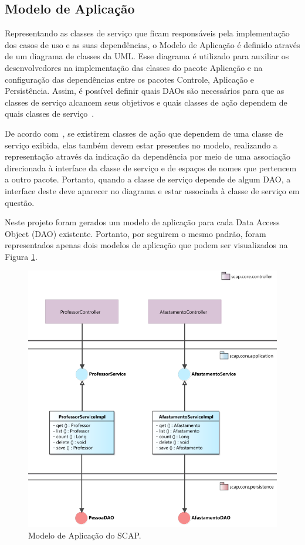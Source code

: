 \subsection{Modelo de Aplicação}
\label{sec-projeto-modelo-aplicacao}

Representando as classes de serviço que ficam responsáveis pela implementação dos casos de uso e as suas dependências, o Modelo de Aplicação é definido através de um diagrama de classes da UML. Esse diagrama é utilizado para auxiliar os desenvolvedores na implementação das classes do pacote Aplicação e na configuração das dependências entre os pacotes Controle, Aplicação e Persistência. Assim, é possível definir quais DAOs são necessários para que as classes de serviço alcancem seus objetivos e quais classes de ação dependem de quais classes de serviço~\cite{souza:masterthesis07}.

De acordo com~, se existirem classes de ação que dependem de uma classe de serviço exibida, elas também devem estar presentes no modelo, realizando a representação através da indicação da dependência por meio de uma associação direcionada à interface da classe de serviço e de espaços de nomes que pertencem a outro pacote. Portanto, quando a classe de serviço depende de algum DAO, a interface deste deve aparecer no diagrama e estar associada à classe de serviço em questão.

Neste projeto foram gerados um modelo de aplicação para cada Data Access Object (DAO) existente. Portanto, por seguirem o mesmo padrão, foram representados apenas dois modelos de aplicação que podem ser visualizados na Figura \ref{fig-projeto-aplicacao}.

\begin{figure}[h]
	\centering
	\includegraphics[scale=0.6]{figuras/fig-projeto-aplicacao} 
	\caption{Modelo de Aplicação do SCAP.}
	\label{fig-projeto-aplicacao}
\end{figure}    

